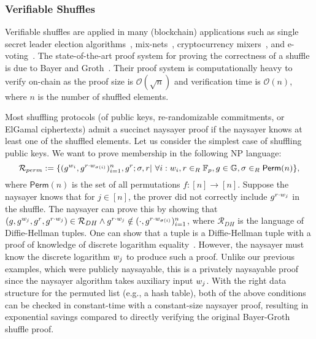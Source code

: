 \subsubsection{Verifiable Shuffles}\label{sec:verifiable_shuffle_naysayer}
Verifiable shuffles are applied in many (blockchain) applications such as single secret leader election algorithms~\cite{AFT:Boneh20}, mix-nets~\cite{CACM:Chaum81}, cryptocurrency mixers~\cite{EPRINT:SNBB19}, and e-voting~\cite{USENIX:Adida08}. The state-of-the-art proof system for proving the correctness of a shuffle is due to Bayer and Groth~\cite{EC:BayGro12}. Their proof system is computationally heavy to verify on-chain as the proof size is $\mathcal{O}(\sqrt{n})$ and verification time is $\mathcal{O}(n)$, where $n$ is the number of shuffled elements. 

Most shuffling protocols (of public keys, re-randomizable commitments, or ElGamal ciphertexts) admit a succinct naysayer proof if the naysayer knows at least one of the shuffled elements. Let us consider the simplest case of shuffling public keys. We want to prove membership in the following  NP language:
\begin{equation}\label{eq:permlanguage}
    \mathcal{R}_{perm}:=\{(g^{w_i},g^{r\cdot w_{\sigma(i)}})^{n}_{i=1},g^r;\sigma,r\vert\ \forall i:w_i,r\in_{R}\mathbb{F}_p,g\in\mathbb{G},  \sigma\in_{R}\mathsf{Perm}(n)\}, 
\end{equation}
where $\mathsf{Perm}(n)$ is the set of all permutations $f:[n]\rightarrow[n]$.
Suppose the naysayer knows that for $j\in[n]$, the prover did not correctly include $g^{r\cdot w_j}$ in the shuffle. The naysayer can prove this by showing that $(g,g^{w_j},g^r,g^{r\cdot w_j})\in\mathcal{R}_{DH}\land g^{r\cdot w_j}\notin (\cdot,g^{r\cdot w_{\sigma(i)}})^n_{i=1}$, where $\mathcal{R}_{DH}$ is the language of Diffie-Hellman tuples. One can show that a tuple is a Diffie-Hellman tuple with a proof of knowledge of discrete logarithm equality~\cite{C:ChaPed92}. However, the naysayer must know the discrete logarithm $w_j$ to produce such a proof. Unlike our previous examples, which were publicly naysayable, this is a privately naysayable proof since the naysayer algorithm takes auxiliary input $w_j$. With the right data structure for the permuted list (e.g., a hash table), both of the above conditions can be checked in constant-time with a constant-size naysayer proof, resulting in exponential savings compared to directly verifying the original Bayer-Groth shuffle proof.

